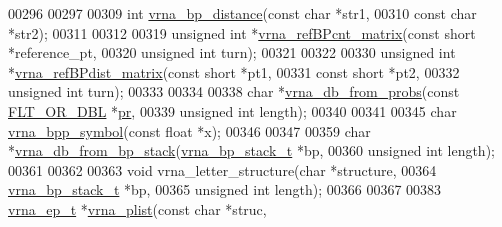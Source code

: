 \begin{DoxyCode}
00296 
00297 
00309 \textcolor{keywordtype}{int} \hyperlink{group__struct__utils_ga65bdfbac6a16bf30286e8a3f7d15f60a}{vrna\_bp\_distance}(\textcolor{keyword}{const} \textcolor{keywordtype}{char} *str1,
00310                      \textcolor{keyword}{const} \textcolor{keywordtype}{char} *str2);
00311 
00312 
00319 \textcolor{keywordtype}{unsigned} \textcolor{keywordtype}{int} *\hyperlink{group__struct__utils_gab4c2a00c99ce1d612ffa5bde114eb96d}{vrna\_refBPcnt\_matrix}(\textcolor{keyword}{const} \textcolor{keywordtype}{short}  *reference\_pt,
00320                                    \textcolor{keywordtype}{unsigned} \textcolor{keywordtype}{int} turn);
00321 
00322 
00330 \textcolor{keywordtype}{unsigned} \textcolor{keywordtype}{int} *\hyperlink{group__struct__utils_ga5a27bd058183170afd4716f5b8ff511a}{vrna\_refBPdist\_matrix}(\textcolor{keyword}{const} \textcolor{keywordtype}{short}   *pt1,
00331                                     \textcolor{keyword}{const} \textcolor{keywordtype}{short}   *pt2,
00332                                     \textcolor{keywordtype}{unsigned} \textcolor{keywordtype}{int}  turn);
00333 
00334 
00338 \textcolor{keywordtype}{char} *\hyperlink{group__struct__utils_ga0c28c410a5ab22d6ab9c77a84e8d5b44}{vrna\_db\_from\_probs}(\textcolor{keyword}{const} \hyperlink{group__data__structures_ga31125aeace516926bf7f251f759b6126}{FLT\_OR\_DBL} *\hyperlink{fold__vars_8h_ac98ec419070aee6831b44e5c700f090f}{pr},
00339                          \textcolor{keywordtype}{unsigned} \textcolor{keywordtype}{int}     length);
00340 
00341 
00345 \textcolor{keywordtype}{char} \hyperlink{group__struct__utils_ga025bff1b27fa46534c8fae6980f64bb5}{vrna\_bpp\_symbol}(\textcolor{keyword}{const} \textcolor{keywordtype}{float} *x);
00346 
00347 
00359 \textcolor{keywordtype}{char} *\hyperlink{group__struct__utils_ga27bea2c241564af53a065982183389df}{vrna\_db\_from\_bp\_stack}(\hyperlink{group__data__structures_structvrna__bp__stack__s}{vrna\_bp\_stack\_t} *bp,
00360                             \textcolor{keywordtype}{unsigned} \textcolor{keywordtype}{int}    length);
00361 
00362 
00363 \textcolor{keywordtype}{void} vrna\_letter\_structure(\textcolor{keywordtype}{char}             *structure,
00364                            \hyperlink{group__data__structures_structvrna__bp__stack__s}{vrna\_bp\_stack\_t}  *bp,
00365                            \textcolor{keywordtype}{unsigned} \textcolor{keywordtype}{int}     length);
00366 
00367 
00383 \hyperlink{group__struct__utils_structvrna__elem__prob__s}{vrna\_ep\_t} *\hyperlink{group__struct__utils_gaf002d69024d709744664a8b9ca3dd77d}{vrna\_plist}(\textcolor{keyword}{const} \textcolor{keywordtype}{char}  *struc,

\end{DoxyCode}
